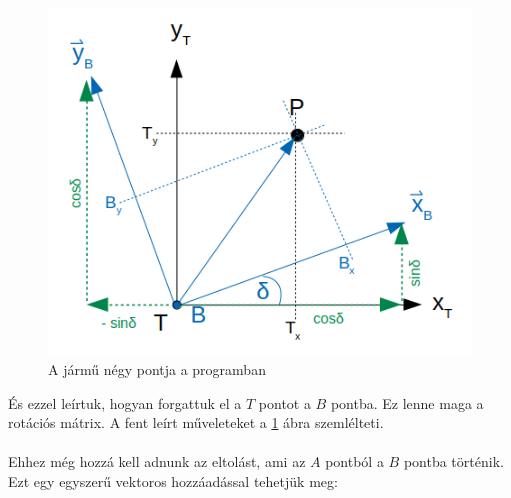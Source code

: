 \begin{figure}[h!]
\centering
\includegraphics[scale=0.70]{images/T_to_B_point.png}
\caption{A jármű négy pontja a programban}
\label{fig:t_to_b_point}
\end{figure}

És ezzel leírtuk, hogyan forgattuk el a $ T $ pontot a $ B $ pontba. Ez lenne maga a rotációs mátrix. A fent leírt műveleteket a \ref{fig:t_to_b_point} ábra szemlélteti.
\\\\
Ehhez még hozzá kell adnunk az eltolást, ami az $ A $ pontból a $ B $ pontba történik. Ezt egy egyszerű vektoros hozzáadással tehetjük meg:\\


